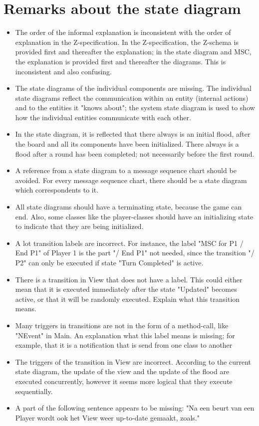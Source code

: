 \documentclass[a4paper,11pt]{article}
\begin{document}
	\section{Remarks about the state diagram}
    \begin{itemize}
        \item The order of the informal explanation is inconsistent with the order of explanation in the Z-specification. In the Z-specification, the Z-schema is provided first and thereafter the explanation; in the state diagram and MSC, the explanation is provided first and thereafter the diagrams. This is inconsistent and also confusing.
        \item The state diagrams of the individual components are missing. The individual state diagrams reflect the communication within an entity (internal actions) and to the entities it "knows about"; the system state diagram is used to show how the individual entities communicate with each other.
        \item In the state diagram, it is reflected that there always is an initial flood, after the board and all its components have been initialized. There always is a flood after a round has been completed; not necessarily before the first round.
        \item A reference from a state diagram to a message sequence chart should be avoided. For every message sequence chart, there should be a state diagram which correspondents to it.
        \item All state diagrams should have a terminating state, because the game can end. Also, some classes like the player-classes should have an initializing state to indicate that they are being initialized.
        \item A lot transition labels are incorrect. For instance, the label "MSC for P1 / End P1" of Player 1 is the part "/ End P1" not needed, since the transition "/ P2" can only be executed if state "Turn Completed" is active.
        \item There is a transition in View that does not have a label. This could either mean that it is executed immediately after the state "Updated" becomes active, or that it will be randomly executed. Explain what this transition means.
        \item Many triggers in transitions are not in the form of a method-call, like "NEvent" in Main. An explanation what this label means is missing; for example, that it is a notification that is send from one class to another
        \item The triggers of the transition in View are incorrect. According to the current state diagram, the update of the view and the update of the flood are executed concurrently, however it seems more logical that they execute sequentially.
        \item A part of the following sentence appears to be missing: "Na een beurt van een Player wordt ook het View weer up-to-date gemaakt, zoals."
    \end{itemize}
\end{document}
